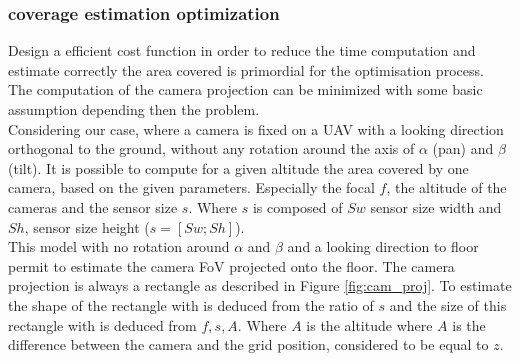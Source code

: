 \subsubsection{coverage estimation optimization}
Design a efficient cost function in order to reduce the time computation and estimate correctly the area covered is primordial for the optimisation process. \\
  The computation of the camera projection can be minimized with some basic assumption depending then the problem.\\
  
Considering our case, where a camera is fixed on a UAV with a looking direction orthogonal to the ground, without any rotation around the axis of $\alpha$ (pan) and $\beta$ (tilt). It is  possible to compute for a given altitude the area covered by one camera, based on the given parameters. Especially the focal $f$, the altitude of the cameras and the sensor size $s$. Where $s$ is composed of $Sw$ sensor size width and $Sh$, sensor size height ($s= [Sw ; Sh]$). \\

This model with no rotation around $\alpha$ and $\beta$ and a looking direction to floor permit to estimate the camera FoV projected onto the floor. The camera projection is always a rectangle as described in Figure \ref{fig:cam_proj}. To estimate the shape of the rectangle with is deduced from the ratio of $s$ and the size of this rectangle with is deduced from $ f ,s ,A$. Where $A$ is the altitude where $A$ is the difference between the camera and the grid position, considered to be equal to $z$.  

